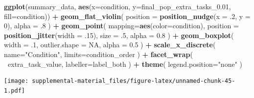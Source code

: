 \documentclass[]{book}
\newenvironment{Shaded}{\begin{snugshade}}{\end{snugshade}}
\newcommand{\DataTypeTok}[1]{\textcolor[rgb]{0.13,0.29,0.53}{#1}}
\newcommand{\DecValTok}[1]{\textcolor[rgb]{0.00,0.00,0.81}{#1}}
\newcommand{\FloatTok}[1]{\textcolor[rgb]{0.00,0.00,0.81}{#1}}
\newcommand{\KeywordTok}[1]{\textcolor[rgb]{0.13,0.29,0.53}{\textbf{#1}}}
\newcommand{\NormalTok}[1]{#1}
\newcommand{\OperatorTok}[1]{\textcolor[rgb]{0.81,0.36,0.00}{\textbf{#1}}}
\newcommand{\OtherTok}[1]{\textcolor[rgb]{0.56,0.35,0.01}{#1}}
\newcommand{\StringTok}[1]{\textcolor[rgb]{0.31,0.60,0.02}{#1}}
\begin{document}
\begin{Shaded}
\begin{Highlighting}[]
\KeywordTok{ggplot}\NormalTok{(summary_data, }\KeywordTok{aes}\NormalTok{(}\DataTypeTok{x=}\NormalTok{condition, }\DataTypeTok{y=}\NormalTok{final_pop_extra_tasks_}\FloatTok{0.01}\NormalTok{, }\DataTypeTok{fill=}\NormalTok{condition)) }\OperatorTok{+}
\StringTok{  }\KeywordTok{geom_flat_violin}\NormalTok{(}
    \DataTypeTok{position =} \KeywordTok{position_nudge}\NormalTok{(}\DataTypeTok{x =} \FloatTok{.2}\NormalTok{, }\DataTypeTok{y =} \DecValTok{0}\NormalTok{),}
    \DataTypeTok{alpha =} \FloatTok{.8}
\NormalTok{  ) }\OperatorTok{+}
\StringTok{  }\KeywordTok{geom_point}\NormalTok{(}
    \DataTypeTok{mapping=}\KeywordTok{aes}\NormalTok{(}\DataTypeTok{color=}\NormalTok{condition),}
    \DataTypeTok{position =} \KeywordTok{position_jitter}\NormalTok{(}\DataTypeTok{width =} \FloatTok{.15}\NormalTok{),}
    \DataTypeTok{size =} \FloatTok{.5}\NormalTok{,}
    \DataTypeTok{alpha =} \FloatTok{0.8}
\NormalTok{  ) }\OperatorTok{+}
\StringTok{  }\KeywordTok{geom_boxplot}\NormalTok{(}
    \DataTypeTok{width =} \FloatTok{.1}\NormalTok{,}
    \DataTypeTok{outlier.shape =} \OtherTok{NA}\NormalTok{,}
    \DataTypeTok{alpha =} \FloatTok{0.5}
\NormalTok{  ) }\OperatorTok{+}
\StringTok{  }\KeywordTok{scale_x_discrete}\NormalTok{(}
    \DataTypeTok{name=}\StringTok{"Condition"}\NormalTok{,}
    \DataTypeTok{limits=}\NormalTok{condition_order}
\NormalTok{  ) }\OperatorTok{+}
\StringTok{  }\KeywordTok{facet_wrap}\NormalTok{(}
    \OperatorTok{~}\NormalTok{extra_task_value,}
    \DataTypeTok{labeller=}\NormalTok{label_both}
\NormalTok{  ) }\OperatorTok{+}
\StringTok{  }\KeywordTok{theme}\NormalTok{(}
    \DataTypeTok{legend.position=}\StringTok{"none"}
\NormalTok{  )}
\end{Highlighting}
\end{Shaded}

\texttt{[image: supplemental-material\_files/figure-latex/unnamed-chunk-45-1.pdf]}

\begin{Shaded}
\end{Shaded}
\end{document}
